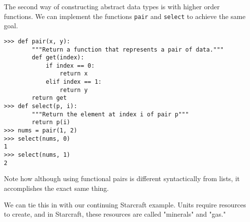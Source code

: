 The second way of constructing abstract data types is with higher order functions. We can
implement the functions {\tt pair} and {\tt select} to achieve the same
goal.

\begin{lstlisting}
>>> def pair(x, y):
        """Return a function that represents a pair of data."""
        def get(index):
            if index == 0:
                return x
            elif index == 1:
                return y
        return get
>>> def select(p, i):
        """Return the element at index i of pair p"""
        return p(i)
>>> nums = pair(1, 2)
>>> select(nums, 0)
1
>>> select(nums, 1)
2
\end{lstlisting}

Note how although using functional pairs is different syntactically from lists,
it accomplishes the exact same thing.

We can tie this in with our continuing Starcraft example. Units require
resources to create, and in Starcraft, these resources are called "minerals" and
"gas."
